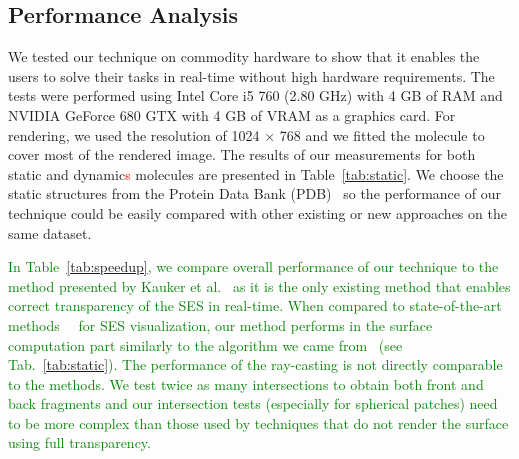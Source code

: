 \subsection{Performance Analysis}
\label{sec:performance}

We tested our technique on commodity hardware to show that it enables the users to solve their tasks in real-time without high hardware requirements.
The tests were performed using Intel Core i5 760 (2.80 GHz) with 4 GB of RAM and NVIDIA GeForce 680 GTX with 4 GB of VRAM as a graphics card.
For rendering, we used the resolution of 1024 $\times$ 768 and we fitted the molecule to cover most of the rendered image.
The results of our measurements for both static and dynamic\textcolor{red}{s} molecules are presented in Table~\ref{tab:static}.
We choose the static structures from the Protein Data Bank (PDB)~\cite{sussman1998protein} so the performance of our technique could be easily compared with other existing or new approaches on the same dataset.

\textcolor{green}{
In Table~\ref{tab:speedup}, we compare overall performance of our technique to the method presented by Kauker et al.~\cite{kauker2013rendering} as it is the only existing method that enables correct transparency of the SES in real-time.
When compared to state-of-the-art methods~\cite{lindow2010accelerated}~\cite{krone2011parallel} for SES visualization, our method performs in the surface computation part similarly to the algorithm we came from~\cite{krone2011parallel} (see Tab.~\ref{tab:static}).
The performance of the ray-casting is not directly comparable to the methods.
We test twice as many intersections to obtain both front and back fragments and our intersection tests (especially for spherical patches) need to be more complex than those used by techniques that do not render the surface using full transparency.
}

\setlength{\tabcolsep}{4.5pt}

